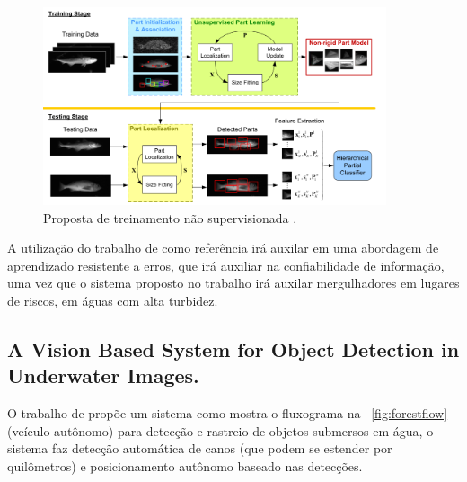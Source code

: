 \begin{figure}[h]
	\caption{\label{fig:trainingchuan}Proposta de treinamento não supervisionada .}
	\begin{center}
	    \includegraphics[width=0.9\textwidth]{resources/training}
	\end{center}
\end{figure}
   

A utilização do trabalho de  como referência irá auxilar em uma abordagem de aprendizado resistente a erros, que irá auxiliar na confiabilidade de informação, uma vez que o sistema proposto no trabalho irá auxilar mergulhadores em lugares de riscos, em águas com alta turbidez. 


\subsection{A Vision Based System for Object Detection in Underwater Images.}

O trabalho de  propõe um sistema como mostra o fluxograma na ~\ref{fig:forestflow} (veículo autônomo) para detecção e rastreio de objetos submersos em água, o sistema faz detecção automática de canos (que podem se estender por quilômetros) e posicionamento autônomo baseado nas detecções.

